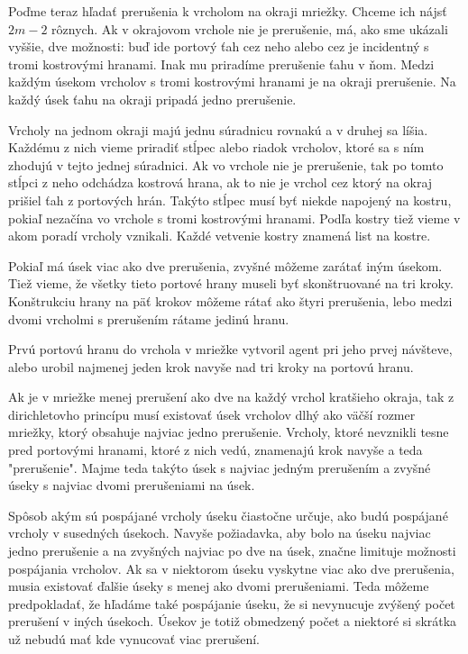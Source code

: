 Poďme teraz hľadať prerušenia k vrcholom na  okraji mriežky. 
Chceme ich nájsť $2m - 2$ rôznych. Ak
v okrajovom vrchole nie je prerušenie, má, ako sme ukázali vyššie, 
dve možnosti: 
buď ide portový ťah cez neho alebo cez je incidentný s tromi kostrovými
hranami. Inak mu priradíme prerušenie ťahu v ňom. Medzi každým úsekom
vrcholov s tromi kostrovými hranami je na okraji prerušenie. Na každý úsek
ťahu na okraji pripadá jedno prerušenie.

Vrcholy na jednom okraji majú jednu súradnicu rovnakú a v druhej sa líšia.
Každému z nich vieme priradiť stĺpec alebo riadok vrcholov, ktoré sa s ním
zhodujú v tejto jednej súradnici. Ak vo vrchole nie je prerušenie, tak po
tomto stĺpci z neho odchádza kostrová hrana, ak to nie je vrchol cez ktorý na
okraj prišiel ťah z portových hrán. Takýto stĺpec musí byť niekde napojený
na kostru, pokiaľ nezačína vo vrchole s tromi kostrovými hranami. Podľa
kostry tiež vieme v akom poradí vrcholy vznikali. Každé vetvenie kostry
znamená list na kostre.

Pokiaľ má úsek viac ako dve prerušenia, zvyšné môžeme zarátať iným úsekom.
Tiež vieme, že všetky tieto portové hrany museli byť skonštruované na tri kroky.
Konštrukciu hrany na päť krokov môžeme rátať ako štyri prerušenia, lebo
medzi dvomi vrcholmi s prerušením rátame jedinú hranu.

Prvú portovú hranu do vrchola v mriežke vytvoril agent pri jeho prvej
návšteve, alebo urobil najmenej jeden krok navyše nad tri kroky na portovú
hranu.

Ak je v mriežke menej prerušení ako dve na každý vrchol kratšieho okraja,
tak z dirichletovho princípu musí existovať úsek vrcholov dlhý ako väčší
rozmer mriežky, ktorý obsahuje najviac jedno prerušenie.
Vrcholy, ktoré nevznikli tesne pred portovými hranami, ktoré z nich vedú,
znamenajú krok navyše a teda "prerušenie". Majme teda takýto úsek s najviac
jedným prerušením a zvyšné úseky s najviac dvomi prerušeniami na úsek.

Spôsob akým sú pospájané vrcholy úseku čiastočne určuje, ako budú pospájané
vrcholy v susedných úsekoch. Navyše požiadavka, aby bolo na úseku najviac
jedno prerušenie a na zvyšných najviac po dve na úsek, značne limituje
možnosti pospájania vrcholov.
Ak sa v niektorom úseku vyskytne viac ako dve prerušenia, musia existovať
ďalšie úseky s menej ako dvomi prerušeniami. Teda môžeme predpokladať, že
hľadáme také pospájanie úseku, že si nevynucuje zvýšený počet prerušení v
iných úsekoch. Úsekov je totiž obmedzený počet a niektoré si skrátka už
nebudú mať kde vynucovať viac prerušení.

